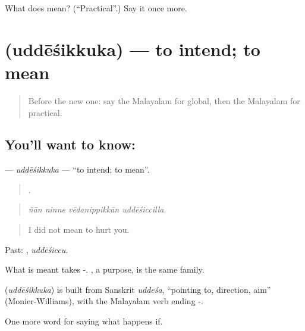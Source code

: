 \begin{tcolorbox}[breakable,colback=teal!4,colframe=teal!35!black,title={Before you move on}]
What does  mean? (\textquotedblleft{}Practical\textquotedblright{}.) Say it once more.
\end{tcolorbox}
\section[\texorpdfstring{\ml{ഉദ്ദേശിക്കുക} (uddēśikkuka)}{ഉദ്ദേശിക്കുക (uddēśikkuka)}]{ (uddēśikkuka) — to intend; to mean}

\label{lesson:ML-C460-uddesikkuka}



\begin{quote}
Before the new one: say the Malayalam for global, then the Malayalam for practical.
\end{quote}

\subsection*{You'll want to know: }
\textbf{} — \emph{uddēśikkuka} — \textquotedblleft{}to intend; to mean\textquotedblright{}.

\begin{quote}
   .
\end{quote}

\begin{quote}
\emph{ñān ninne vēdanippikkān uddēśiccilla.}
\end{quote}

\begin{quote}
I did not mean to hurt you.
\end{quote}

Past: , \emph{uddēśiccu}.

What is meant takes -. , a purpose, is the same family.

\begin{cousinweb}
\textbf{} (\emph{uddēśikkuka}) is built from Sanskrit \emph{uddeśa}, \textquotedblleft{}pointing to, direction, aim\textquotedblright{} (Monier-Williams), with the Malayalam verb ending -.
\end{cousinweb}

\begin{grammarlens}[title={What you've built}]
One more word for saying what happens if.
\end{grammarlens}

